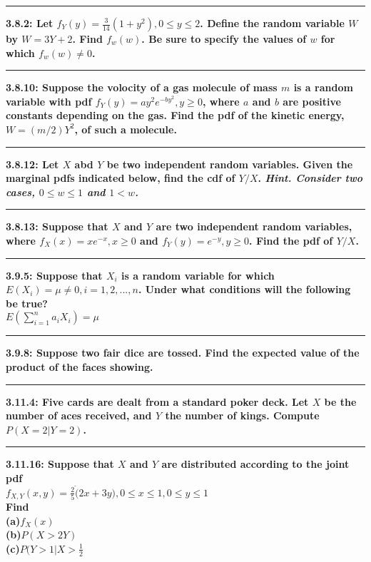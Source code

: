 \documentclass[11pt]{article}
\newcommand\question[2]{\vspace{.25in}\hrule\textbf{#1: #2}\vspace{.5em}\vspace{.10in}}
\renewcommand\part[1]{\vspace{.10in}\textbf{(#1)}}
\begin{document}
\question{3.8.2}
{Let $f_{Y}(y) = \frac{3}{14}(1+y^{2}),0 \leq y \leq 2$. Define the random
variable $W$ by $W=3Y + 2$. Find $f_{w}(w)$. Be sure to specify the values
of $w$ for which $f_{w}(w) \neq  0$.}


\question{3.8.10}
{Suppose the volocity of a gas molecule of mass $m$ is a random variable with
pdf $f_{Y}(y) = ay^{2}e^{-by^{2}},y \geq 0$, where $a$ and $b$ are positive
constants depending on the gas. Find the pdf of the kinetic energy, 
$W =(m/2)Y^{2}$, of such a molecule.}


\question{3.8.12}
{Let $X$ abd $Y$ be two independent random variables. Given the marginal pdfs
indicated below, find the cdf of $Y/X$. \emph{Hint. Consider two cases,
$0 \leq w \leq 1$ and $1 < w$.}}


\question{3.8.13}
{Suppose that $X$ and $Y$ are two independent random variables, where 
$f_{X}(x) =xe^{-x},x \geq 0$ and $f_{Y}(y) = e^{-y},y \geq 0$. Find the pdf of
$Y/X$.}


\question{3.9.5}
{Suppose that $X_{i}$ is a random variable for which 
$E(X_{i}) = \mu \neq 0,i=1,2,...,n$. Under what conditions will the following
be true?\\
$E(\sum_{i=1}^{n} a_{i} X_{i}) = \mu$}


\question{3.9.8}
{Suppose two fair dice are tossed. Find the expected value of the product of the
faces showing.}


\question{3.11.4}
{Five cards are dealt from a standard poker deck. Let $X$ be the number of aces
received, and $Y$ the number of kings. Compute $P(X = 2|Y=2)$.}


\question{3.11.16}
{Suppose that $X$ and $Y$ are distributed according to the joint pdf \\
$f_{X,Y}(x,y) = \frac{2}{5} \dot (2x + 3y), 0 \leq x\leq 1, 0 \leq y \leq 1$ \\
Find
}
\\

\part{a}{$f_X(x)$}
\\
\part{b}{$P(X>2Y)$}
\\
\part{c}{$P(Y>1|X>\frac{1}{2}$}
\end{document}
